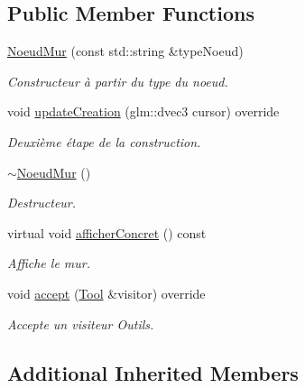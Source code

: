 \subsection*{Public Member Functions}
{\bf }\par
\begin{DoxyCompactItemize}
\item 
\hyperlink{class_noeud_mur_aeab2deec90548c0bdca5eb86beb629cf}{Noeud\+Mur} (const std\+::string \&type\+Noeud)
\begin{DoxyCompactList}\small\item\em Constructeur à partir du type du noeud. \end{DoxyCompactList}\item 
void \hyperlink{class_noeud_mur_a9f86d3ce3675f79abe879143e6dd4e8b}{update\+Creation} (glm\+::dvec3 cursor) override
\begin{DoxyCompactList}\small\item\em Deuxième étape de la construction. \end{DoxyCompactList}\item 
\hyperlink{class_noeud_mur_a169060e04a6423e7f025d475afd7d9ea}{$\sim$\+Noeud\+Mur} ()
\begin{DoxyCompactList}\small\item\em Destructeur. \end{DoxyCompactList}\item 
virtual void \hyperlink{class_noeud_mur_a521a3062875ea6ed1645485412a70c7b}{afficher\+Concret} () const 
\begin{DoxyCompactList}\small\item\em Affiche le mur. \end{DoxyCompactList}\item 
\hypertarget{class_noeud_mur_a267fe3fba8110e59fa76412f788ea8d1}{}void \hyperlink{class_noeud_mur_a267fe3fba8110e59fa76412f788ea8d1}{accept} (\hyperlink{class_tool}{Tool} \&visitor) override\label{class_noeud_mur_a267fe3fba8110e59fa76412f788ea8d1}

\begin{DoxyCompactList}\small\item\em Accepte un visiteur Outils. \end{DoxyCompactList}\end{DoxyCompactItemize}

\subsection*{Additional Inherited Members}


